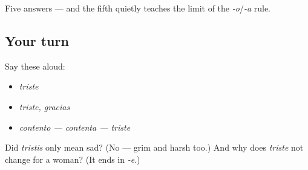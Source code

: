 \begin{grammarlens}[title={What you've built}]
Five answers — and the fifth quietly teaches the limit of the \emph{-o}/\emph{-a} rule.
\end{grammarlens}

\subsection*{Your turn}
Say these aloud:

\begin{itemize}
\raggedright
  \item \emph{triste}
  \item \emph{triste, gracias}
  \item \emph{contento — contenta — triste}
\end{itemize}

\begin{tcolorbox}[breakable,colback=teal!4,colframe=teal!35!black,title={Before you move on}]
Did \emph{tristis} only mean sad? (No — grim and harsh too.) And why does \emph{triste} not change for a woman? (It ends in \emph{-e}.)
\end{tcolorbox}
